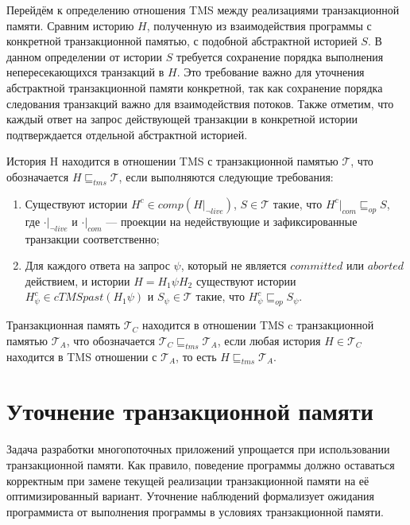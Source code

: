Перейдём к определению отношения TMS между реализациями транзакционной памяти. Сравним историю $H$, полученную из взаимодействия программы с конкретной транзакционной памятью, с подобной абстрактной историей $S$. В данном определении от истории $S$ требуется сохранение порядка выполнения непересекающихся транзакций в $H$. Это требование важно для уточнения абстрактной транзакционной памяти конкретной, так как сохранение порядка следования транзакций важно для взаимодействия потоков. Также отметим, что каждый ответ на запрос действующей транзакции в конкретной истории подтверждается отдельной абстрактной историей.
\begin{mydefinition}\label{tms}
История H находится в отношении TMS с транзакционной памятью $\mathcal{T}$, что обозначается $H \sqsubseteq_{tms} \mathcal{T}$, если выполняются следующие требования:
\begin{enumerate}
\item Существуют истории $H^c \in comp(H|_{\neg live})$, $S \in \mathcal{T}$ такие, что $H^c|_{com} \sqsubseteq_{op} S$, где $\cdot|_{\neg live}$ и $\cdot|_{com}$ --- проекции на недействующие и зафиксированные транзакции соответственно; \label{tms:1}
\item Для каждого ответа на запрос $\psi$, который не является $committed$ или $aborted$ действием, и истории $H = H_1\psi{H_2}$ существуют истории $H^c_{\psi} \in cTMSpast(H_1\psi)$ и $S_{\psi} \in \mathcal{T}$ такие, что $H^c_{\psi} \sqsubseteq_{op} S_{\psi}$. \label{tms:2}
\end{enumerate}
Транзакционная память $\mathcal{T}_C$ находится в отношении TMS c транзакционной памятью $\mathcal{T}_A$, что обозначается $\mathcal{T}_C \sqsubseteq_{tms} \mathcal{T}_A$, если любая история $H \in \mathcal{T}_C$ находится в TMS отношении с $\mathcal{T}_A$, то есть $H \sqsubseteq_{tms} \mathcal{T}_{A}$.
\end{mydefinition}

\section{Уточнение транзакционной памяти}
Задача разработки многопоточных приложений упрощается при использовании транзакционной памяти. Как правило, поведение программы должно оставаться корректным при замене текущей реализации транзакционной памяти на её оптимизированный вариант. Уточнение наблюдений формализует ожидания программиста от выполнения программы в условиях транзакционной памяти.

